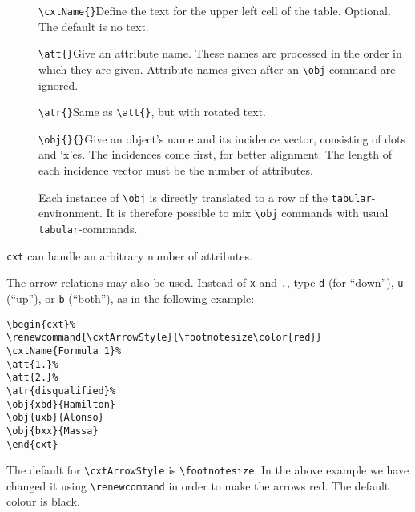 \documentclass[12pt]{article}
\begin{document}
\begin{description}
\item[]\verb|\cxtName{}|\quad Define the text for the upper left cell of the
  table. Optional. The default is no text.
\item[]\verb|\att{}|\quad Give an attribute name. These names are processed
  in the order in which they are given. Attribute names given after an
  \verb|\obj|  command are ignored.
\item[]\verb|\atr{}|\quad Same as \verb|\att{}|, but with rotated text.
\item[]\verb|\obj{}{}|\quad Give an object's name and its incidence vector,
  consisting of dots and `x'es. The incidences come first, for better
  alignment. The length of each incidence vector must be the number of
  attributes. 

Each  instance of \verb|\obj| is directly translated to a row of the
\verb|tabular|-environment. It is therefore possible to mix  \verb|\obj|
commands with usual  \verb|tabular|-commands.
\end{description}
\texttt{cxt} can handle an arbitrary number of attributes.
\bigbreak

The arrow relations may also be used. Instead of \texttt{x} and \texttt{.},
type \texttt{d} (for ``down''), \texttt{u} (``up''), or \texttt{b} (``both''), 
as in the following example:\bigbreak 

\noindent\begin{minipage}{.45\textwidth}
\begin{verbatim}
\begin{cxt}%
\renewcommand{\cxtArrowStyle}{\footnotesize\color{red}}
\cxtName{Formula 1}%
\att{1.}%
\att{2.}%
\atr{disqualified}%
\obj{xbd}{Hamilton}
\obj{uxb}{Alonso}
\obj{bxx}{Massa}
\end{cxt}
\end{verbatim}
\end{minipage}
\hfill
\begin{minipage}{.40\textwidth}
\strut\par\strut\par
\begin{cxt}%
\renewcommand{\cxtArrowStyle}{\footnotesize\color{red}}
%
%
%
%
\end{cxt}
\end{minipage}
\bigbreak

The default for \verb|\cxtArrowStyle| is \verb|\footnotesize|. In the above
example we have changed it using \verb|\renewcommand| in order to make the
arrows red. The default colour is black. 
\end{document}
